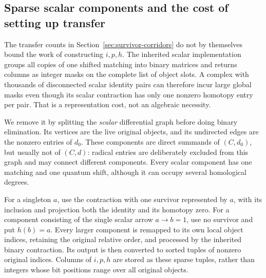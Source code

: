 \subsection{Sparse scalar components and the cost of setting up transfer}
\label{sec:sparse-scalar-components}

The transfer counts in Section~\ref{sec:survivor-corridors} do not by themselves
bound the work of constructing $i,p,h$.  The inherited scalar implementation
groups all copies of one shifted matching into binary matrices and returns
columns as integer masks on the complete list of object slots.  A complex
with thousands of disconnected scalar identity pairs can therefore incur
large global masks even though its scalar contraction has only one nonzero
homotopy entry per pair.  That is a representation cost, not an algebraic
necessity.

We remove it by splitting the \emph{scalar} differential graph before doing
binary elimination.  Its vertices are the live original objects, and its
undirected edges are the nonzero entries of $d_0$.  These components are
direct summands of $(C,d_0)$, but usually not of $(C,d)$: radical entries are
deliberately excluded from this graph and may connect different components.
Every scalar component has one matching and one quantum shift, although it
can occupy several homological degrees.

For a singleton $a$, use the contraction with one survivor represented by
$a$, with its inclusion and projection both the identity and its homotopy
zero.  For a component consisting of the single scalar arrow
$a\to b=1$, use no survivor and put $h(b)=a$.  Every larger component is
remapped to its own local object indices, retaining the original relative
order, and processed by the inherited binary contraction.  Its output is
then converted to sorted tuples of nonzero original indices.  Columns of
$i,p,h$ are stored as these sparse tuples, rather than integers whose bit
positions range over all original objects.

